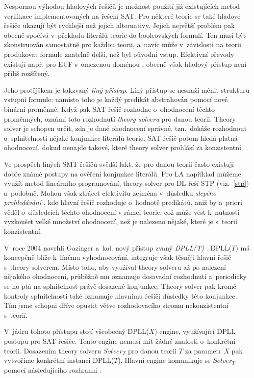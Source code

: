 Nespornou výhodou hladových řešičů je možnost použití již existujících metod verifikace implementovaných na řešení SAT. Pro některé teorie se také hladové řešiče ukazují být rychlejší než jejich alternativy. Jejich největší problém pak obecně spočívá v~překladu literálů teorie do booleovských formulí. Ten musí být zkonstruován samostatně pro každou teorii, a~navíc může v~závislosti na teorii produkovat formule znatelně delší, než byl původní vstup. Efektivní převody existují např. pro EUF s~omezenou doménou \cite{Randal02}, obecně však hladový přístup není příliš rozšířený.

Jeho protějškem je takzvaný \emph{líný přístup}. Líný přístup se nesnaží měnit strukturu vstupní formule; namísto toho je každý predikát abstrahován pomocí nové binární proměnné. Když pak SAT řešič rozhodne o~ohodnocení těchto proměnných, oznámí toto rozhodnutí \emph{theory solveru} pro danou teorii. Theory solver je schopen určit, zda je dané ohodnocení správné, tzn.~dokáže rozhodnout o~splnitelnosti nějaké konjunkce literálů teorie. SAT řešič potom hledá platná ohodnocení, dokud nenajde takové, které theory solver prohlásí za konzistentní.

Ve prospěch líných SMT řešičů svědší fakt, že pro danou teorii často existují dobře známé postupy na ověření konjunkce literálů. Pro LA například můžeme využít metod lineárního programování, theory solver pro DL řeší STP (viz.~\ref{stp}) a~podobně. Mohou však ztrácet efektivitu zejména v~důsledku \emph{slepého prohledávání} \cite{Moura04}, kde hlavní řešič rozhoduje o~hodnotě predikátů, aniž by a~priori věděl o~důsledcích těchto ohodnocení v rámci teorie, což může vést k~nutnosti vyzkoušet velké množství ohodnocení, než je nalezeno nějaké, které je s~teorií konzistentní.

V~roce 2004 navrhli Gazinger a~kol. nový přístup zvaný \emph{DPLL(T)} \cite{Gazinger04}. DPLL($T$) má koncepčně blíže k~línému vyhodnocování, integruje však těsněji hlavní řešič s~theory solverem. Místo toho, aby využíval theory solveru až po nalezení nějakého ohodnocení, průběžně mu oznamuje dosavadní rozhodnutí a~periodicky se ho ptá na splnitelnost právě dosazené konjunkce. Theory solver pak kromě kontroly splnitelnosti také oznamuje hlavnímu řešiči důsledky této konjunkce. Tím jsme schopni dříve opustit větve rozhodovacího stromu nekonzistentní s~teorií. 

V~jádru tohoto přístupu stojí všeobecný DPLL($X$) engine, využívající DPLL \cite{Davis60} postupu pro SAT řešiče. Tento engine nemusí mít žádné znalosti o~konkrétní teorii. Dosazením theory solveru $Solver_T$ pro danou teorii $T$ za parametr $X$ pak vytvoříme konkrétní instanci DPLL($T$). Hlavní engine komunikuje se $Solver_T$ pomocí následujícího rozhranní \cite{Gazinger04}:

